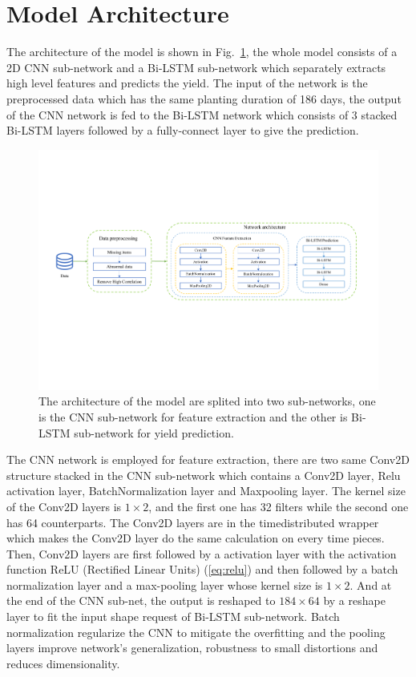 \documentclass[conference, a4paper]{IEEEtran}
\begin{document}
    \section{Model Architecture} \label{sec:Arch}
      The architecture of the model is shown in Fig.~\ref{fig:arch}, the whole model consists of a 2D CNN sub-network and a Bi-LSTM sub-network which separately extracts high level features and predicts the yield. The input of the network is the preprocessed data which has the same planting duration of 186 days, the output of the CNN network is fed to the Bi-LSTM network which consists of 3 stacked Bi-LSTM layers followed by a fully-connect layer to give the prediction.

      \begin{figure}[tb]
        \centering
        \includegraphics[width=\linewidth]{figures/new_arch.pdf}
        \caption{The architecture of the model are splited into two sub-networks, one is the CNN sub-network for feature extraction and the other is Bi-LSTM sub-network for yield prediction.}
        \label{fig:arch}
      \end{figure}

      The CNN network is employed for feature extraction, there are two same Conv2D structure stacked in the CNN sub-network which contains a Conv2D layer, Relu activation layer, BatchNormalization layer and Maxpooling layer. The kernel size of the Conv2D layers is $1\times2$, and the first one has 32 filters while the second one has 64 counterparts. The Conv2D layers are in the timedistributed wrapper which makes the Conv2D layer do the same calculation on every time pieces. Then, Conv2D layers are first followed by a activation layer with the activation function ReLU (Rectified Linear Units) (\ref{eq:relu}) and then followed by a batch normalization layer and a max-pooling layer whose kernel size is $1\times2$. And at the end of the CNN sub-net, the output is reshaped to $184\times64$ by a reshape layer to fit the input shape request of Bi-LSTM sub-network. Batch normalization regularize the CNN to mitigate the overfitting and the pooling layers improve network's generalization, robustness to small distortions and reduces dimensionality.
\end{document}
